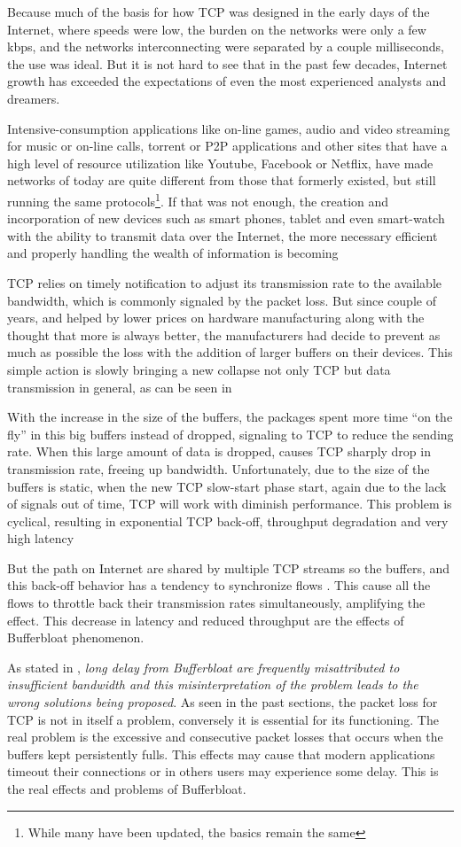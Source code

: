 Because much of the basis for how TCP was designed in the early days of the
Internet, where speeds were low, the burden on the networks were only a few
kbps, and the networks interconnecting were separated by a couple
milliseconds, the use was ideal. But it is not hard to see that in the past
few decades, Internet growth has exceeded the expectations of even the most
experienced analysts and dreamers.

Intensive-consumption applications like on-line games, audio and video
streaming for music or on-line calls, torrent or P2P applications and other
sites that have a high level of resource utilization like Youtube, Facebook or
Netflix, have made networks of today are quite different from those that
formerly existed, but still running the same protocols\footnote{While many
have been updated, the basics remain the same}. If that was not enough, the
creation and incorporation of new devices such as smart phones, tablet and even
smart-watch with the ability to transmit data over the Internet, the more
necessary efficient and properly handling the wealth of information is
becoming

TCP relies on timely notification to adjust its transmission rate to the
available bandwidth, which is commonly signaled by the packet loss. But since
couple of years, and helped by lower prices on hardware manufacturing along
with the thought that more is always better, the manufacturers had decide to
prevent as much as possible the loss with the addition of larger buffers on
their devices. This simple action is slowly bringing a new collapse not only
TCP but data transmission in general, as can be seen in \cite{CACMStaff}

With the increase in the size of the buffers, the packages spent more time
``on the fly'' in this big buffers instead of dropped, signaling to TCP to
reduce the sending rate. When this large amount of data is dropped, causes TCP
sharply drop in transmission rate, freeing up bandwidth. Unfortunately, due to
the size of the buffers is static, when the new TCP slow-start phase start,
again due to the lack of signals out of time, TCP will work with diminish
performance. This problem is cyclical, resulting in exponential TCP back-off,
throughput degradation and very high latency

But the path on Internet are shared by multiple TCP streams so the buffers,
and this back-off behavior has a tendency to synchronize flows
\cite{main:ref:1}. This cause all the flows to throttle back their
transmission rates simultaneously, amplifying the effect. This decrease in
latency and reduced throughput are the effects of Bufferbloat phenomenon.

As stated in \cite{GettysNichols}, \textit{long delay from Bufferbloat are
frequently misattributed to insufficient bandwidth and this misinterpretation
of the problem leads to the wrong solutions being proposed}. As seen in the
past sections, the packet loss for TCP is not in itself a problem, conversely
it is essential for its functioning. The real problem is  the excessive and
consecutive packet losses that occurs when the buffers kept persistently
fulls. This effects may cause that modern applications timeout their
connections or in others users may experience some delay. This is the real
effects and problems of Bufferbloat.